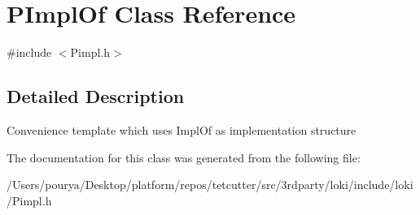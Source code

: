 \hypertarget{classPImplOf}{}\section{P\+Impl\+Of Class Reference}
\label{classPImplOf}


{\ttfamily \#include $<$Pimpl.\+h$>$}



\subsection{Detailed Description}
Convenience template which uses Impl\+Of as implementation structure 

The documentation for this class was generated from the following file\+:\begin{DoxyCompactItemize}
\item 
/\+Users/pourya/\+Desktop/platform/repos/tetcutter/src/3rdparty/loki/include/loki/Pimpl.\+h\end{DoxyCompactItemize}

